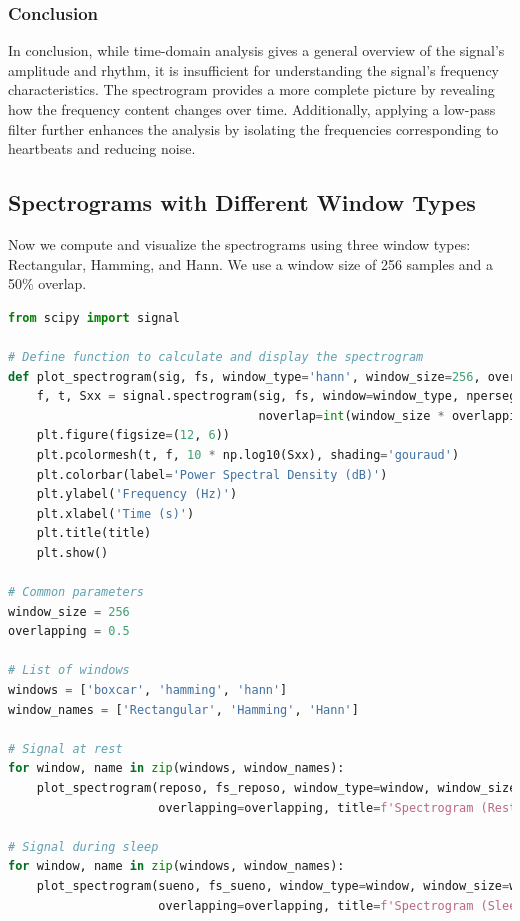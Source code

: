 \documentclass[10pt]{article}
\theoremstyle{definition}
\theoremstyle{remark}
\theoremstyle{definition}
\numberwithin{equation}{prob}
\begin{document}
\subsubsection{Conclusion}

In conclusion, while time-domain analysis gives a general overview of the signal's amplitude and rhythm, it is insufficient for understanding the signal's frequency characteristics. The spectrogram provides a more complete picture by revealing how the frequency content changes over time. Additionally, applying a low-pass filter further enhances the analysis by isolating the frequencies corresponding to heartbeats and reducing noise.









\subsection{Spectrograms with Different Window Types}

Now we compute and visualize the spectrograms using three window types: Rectangular, Hamming, and Hann. We use a window size of 256 samples and a 50\% overlap.

\begin{lstlisting}[language=Python]
from scipy import signal

# Define function to calculate and display the spectrogram
def plot_spectrogram(sig, fs, window_type='hann', window_size=256, overlapping=0.5, title=''):
    f, t, Sxx = signal.spectrogram(sig, fs, window=window_type, nperseg=window_size,
                                   noverlap=int(window_size * overlapping), scaling='spectrum')
    plt.figure(figsize=(12, 6))
    plt.pcolormesh(t, f, 10 * np.log10(Sxx), shading='gouraud')
    plt.colorbar(label='Power Spectral Density (dB)')
    plt.ylabel('Frequency (Hz)')
    plt.xlabel('Time (s)')
    plt.title(title)
    plt.show()

# Common parameters
window_size = 256
overlapping = 0.5

# List of windows
windows = ['boxcar', 'hamming', 'hann']
window_names = ['Rectangular', 'Hamming', 'Hann']

# Signal at rest
for window, name in zip(windows, window_names):
    plot_spectrogram(reposo, fs_reposo, window_type=window, window_size=window_size,
                     overlapping=overlapping, title=f'Spectrogram (Rest) - Window {name}')

# Signal during sleep
for window, name in zip(windows, window_names):
    plot_spectrogram(sueno, fs_sueno, window_type=window, window_size=window_size,
                     overlapping=overlapping, title=f'Spectrogram (Sleep) - Window {name}')
\end{lstlisting}
\end{document}
